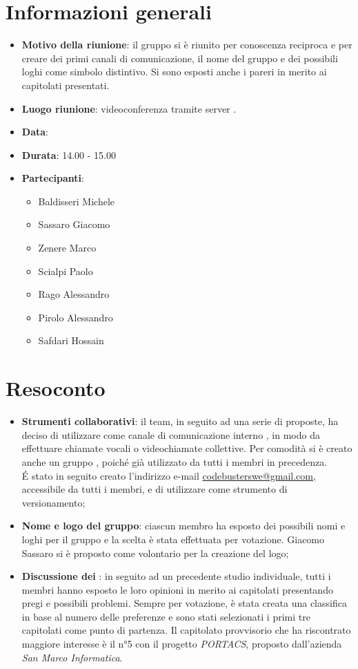\section{Informazioni generali}
\begin{itemize}
\item \textbf{Motivo della riunione}: il gruppo si è riunito per conoscenza reciproca e per creare dei primi canali di comunicazione, il nome del gruppo e dei possibili loghi come simbolo distintivo. Si sono esposti anche i pareri in merito ai capitolati presentati.
\item \textbf{Luogo riunione}: videoconferenza tramite server .
\item \textbf{Data}: \Data{}
\item \textbf{Durata}: 14.00 - 15.00
\item \textbf{Partecipanti}:
	\begin{itemize}
	\item Baldisseri Michele
	\item Sassaro Giacomo
	\item Zenere Marco
	\item Scialpi Paolo
	\item Rago Alessandro
	\item Pirolo Alessandro
	\item Safdari Hossain
	\end{itemize}
\end{itemize}
\newpage
\section{Resoconto}
\begin{itemize}
\item \textbf{Strumenti collaborativi}: il team, in seguito ad una serie di proposte, ha deciso di utilizzare come canale di comunicazione interno , in modo da effettuare chiamate vocali o videochiamate collettive. Per comodità si è creato anche un gruppo , poiché già utilizzato da tutti i membri in precedenza.\\ \'E stato in seguito creato l'indirizzo e-mail \href{mailto:codebusterswe@gmail.com}{\color{cyan}codebusterswe@gmail.com}, accessibile da tutti i membri, e di utilizzare  come strumento di versionamento;

\item \textbf{Nome e logo del gruppo}: ciascun membro ha esposto dei possibili nomi e loghi per il gruppo e la scelta è stata effettuata per votazione. Giacomo Sassaro si è proposto come volontario per la creazione del logo;

\item \textbf{Discussione dei }: in seguito ad un precedente studio individuale, tutti i membri hanno esposto le loro opinioni in merito ai capitolati presentando pregi e possibili problemi. Sempre per votazione, è stata creata una classifica in base al numero delle preferenze e sono stati selezionati i primi tre capitolati come punto di partenza. Il capitolato provvisorio che ha riscontrato maggiore interesse è il n°5 con il progetto \textit{PORTACS}, proposto dall'azienda \textit{San Marco Informatica}.
\end{itemize}